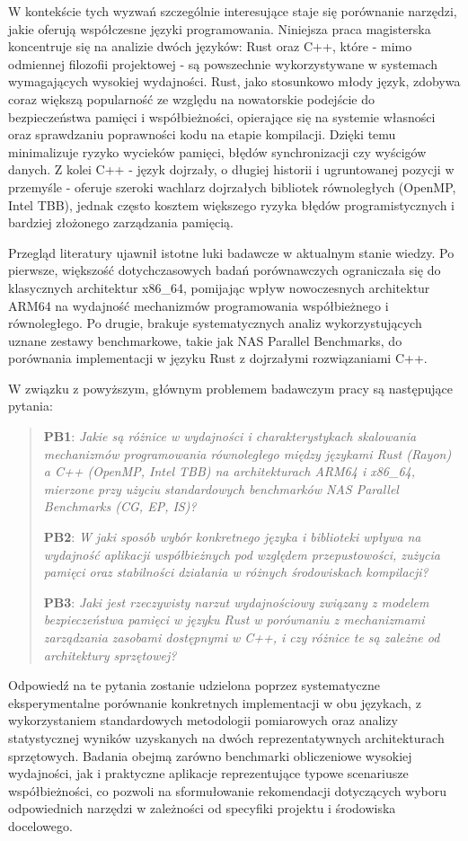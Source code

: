 W kontekście tych wyzwań szczególnie interesujące staje się porównanie narzędzi, jakie oferują współczesne języki programowania. Niniejsza praca magisterska koncentruje się na analizie dwóch języków: Rust oraz C++, które - mimo odmiennej filozofii projektowej - są powszechnie wykorzystywane w systemach wymagających wysokiej wydajności. Rust, jako stosunkowo młody język, zdobywa coraz większą popularność ze względu na nowatorskie podejście do bezpieczeństwa pamięci i współbieżności, opierające się na systemie własności  oraz sprawdzaniu poprawności kodu na etapie kompilacji. Dzięki temu minimalizuje ryzyko wycieków pamięci, błędów synchronizacji czy wyścigów danych. Z kolei C++ - język dojrzały, o długiej historii i ugruntowanej pozycji w przemyśle - oferuje szeroki wachlarz dojrzałych bibliotek równoległych (OpenMP, Intel TBB), jednak często kosztem większego ryzyka błędów programistycznych i bardziej złożonego zarządzania pamięcią.

Przegląd literatury ujawnił istotne luki badawcze w aktualnym stanie wiedzy. Po pierwsze, większość dotychczasowych badań porównawczych ograniczała się do klasycznych architektur x86\_64, pomijając wpływ nowoczesnych architektur ARM64 na wydajność mechanizmów programowania współbieżnego i równoległego. Po drugie, brakuje systematycznych analiz wykorzystujących uznane zestawy benchmarkowe, takie jak NAS Parallel Benchmarks, do porównania implementacji w języku Rust z dojrzałymi rozwiązaniami C++.

W związku z powyższym, głównym problemem badawczym pracy są następujące pytania:
\begin{quote}
    \item \textbf{PB1}: 
    \emph{Jakie są różnice w wydajności i charakterystykach skalowania mechanizmów programowania równoległego między językami Rust (Rayon) a C++ (OpenMP, Intel TBB) na architekturach ARM64 i x86\_64, mierzone przy użyciu standardowych benchmarków NAS Parallel Benchmarks (CG, EP, IS)?}
    \item \textbf{PB2}:
    \emph{W jaki sposób wybór konkretnego języka i biblioteki wpływa na wydajność aplikacji współbieżnych pod względem przepustowości, zużycia pamięci oraz stabilności działania w różnych środowiskach kompilacji?}
    \item \textbf{PB3}:
    \emph{Jaki jest rzeczywisty narzut wydajnościowy związany z modelem bezpieczeństwa pamięci w języku Rust w porównaniu z mechanizmami zarządzania zasobami dostępnymi w C++, i czy różnice te są zależne od architektury sprzętowej?}
\end{quote}
Odpowiedź na te pytania zostanie udzielona poprzez systematyczne eksperymentalne porównanie konkretnych implementacji w obu językach, z wykorzystaniem standardowych metodologii pomiarowych oraz analizy statystycznej wyników uzyskanych na dwóch reprezentatywnych architekturach sprzętowych. Badania obejmą zarówno benchmarki obliczeniowe wysokiej wydajności, jak i praktyczne aplikacje reprezentujące typowe scenariusze współbieżności, co pozwoli na sformułowanie rekomendacji dotyczących wyboru odpowiednich narzędzi w zależności od specyfiki projektu i środowiska docelowego.

